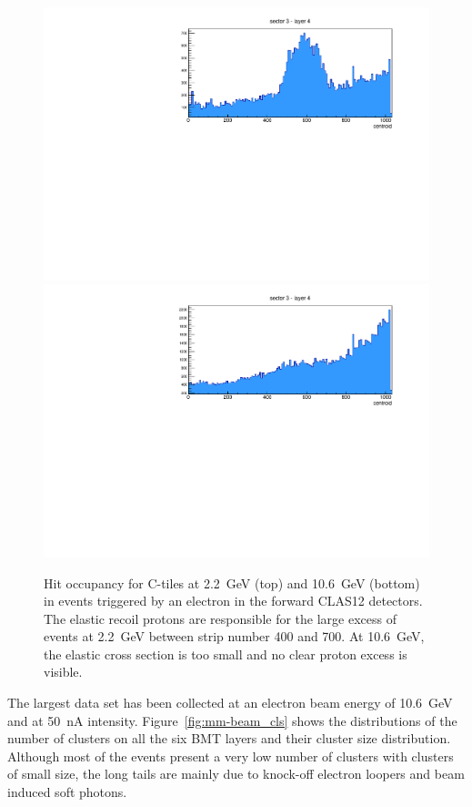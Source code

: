 \begin{figure}[htb]
 \includegraphics[width=1.0\columnwidth]{images/occupancy2GeV}
 \includegraphics[width=1.0\columnwidth]{images/occupancy10GeV}
 \caption{Hit occupancy for C-tiles at 2.2~GeV (top) and 10.6~GeV (bottom) in events triggered by an electron in the forward
   CLAS12 detectors. The elastic recoil protons are responsible for the large excess of events at 2.2~GeV between strip number
   400 and 700. At 10.6~GeV, the elastic cross section is too small and no clear proton excess is visible.}
 \label{fig:mm-occupancy_22_10}
\end{figure}

The largest data set has been collected at an electron beam energy of 10.6~GeV and at 50~nA intensity.
Figure~\ref{fig:mm-beam_cls} shows the distributions of the number of clusters on all the six BMT layers and their cluster size
distribution. Although most of the events present a very low number of clusters with clusters of small size, the long tails are mainly
due to knock-off electron loopers and beam induced soft photons.

